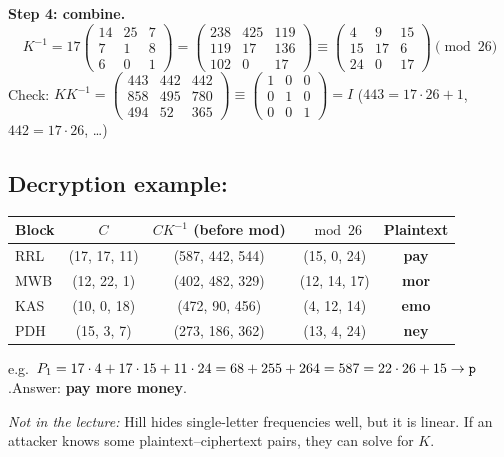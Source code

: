 \textbf{Step 4: combine.}
\[
K^{-1} = 17\begin{pmatrix}14&25&7\\7&1&8\\6&0&1\end{pmatrix}
= \begin{pmatrix}238&425&119\\119&17&136\\102&0&17\end{pmatrix}
\equiv \boxed{\begin{pmatrix}4&9&15\\15&17&6\\24&0&17\end{pmatrix}} \pmod{26}
\]
Check: $KK^{-1} = \begin{pmatrix}443&442&442\\858&495&780\\494&52&365\end{pmatrix} \equiv \begin{pmatrix}1&0&0\\0&1&0\\0&0&1\end{pmatrix} = I$ \checkmark\;
($443 = 17\cdot26+1$, $442 = 17\cdot26$, \dots)

\subsection{Decryption example: }
\begin{center}\small
\begin{tabular}{@{}lcccc@{}}
\toprule
Block & $C$ & $CK^{-1}$ (before mod) & $\bmod 26$ & Plaintext\\
\midrule
RRL & (17, 17, 11) & (587, 442, 544) & (15, 0, 24) & \textbf{pay}\\
MWB & (12, 22, 1) & (402, 482, 329) & (12, 14, 17) & \textbf{mor}\\
KAS & (10, 0, 18) & (472, 90, 456) & (4, 12, 14) & \textbf{emo}\\
PDH & (15, 3, 7) & (273, 186, 362) & (13, 4, 24) & \textbf{ney}\\
\bottomrule
\end{tabular}
\end{center}
e.g.\ $P_1 = 17\cdot4 + 17\cdot15 + 11\cdot24 = 68 + 255 + 264 = 587 = 22\cdot26 + 15 \to \texttt{p}$.\quad Answer: \textbf{pay more money}.

{\small\emph{Not in the lecture:} Hill hides single-letter frequencies well, but it is linear. If an attacker knows some plaintext--ciphertext pairs, they can solve for $K$.}


